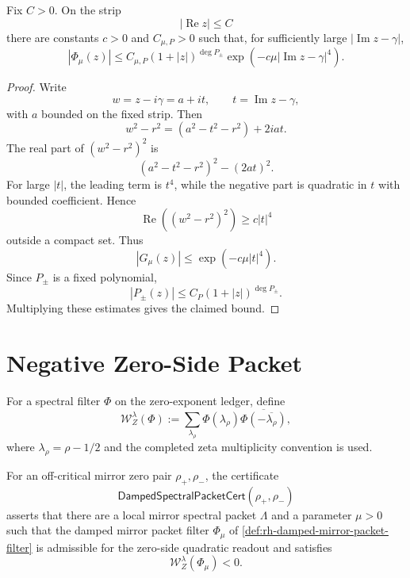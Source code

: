 \begin{theorem}
\label{thm:rh-damped-packet-filter-vertical-decay}
Fix $C>0$.  On the strip
$$
|\operatorname{Re} z|\le C
$$
there are constants $c>0$ and $C_{\mu,P}>0$ such that, for sufficiently
large $|\operatorname{Im}z-\gamma|$,
$$
|\Phi_\mu(z)|
\le
C_{\mu,P}(1+|z|)^{\deg P_\pm}
\exp\left(-c\mu|\operatorname{Im}z-\gamma|^4\right).
$$
\end{theorem}

\begin{proof}
Write
$$
w=z-i\gamma=a+it,
\qquad
t=\operatorname{Im}z-\gamma,
$$
with $a$ bounded on the fixed strip.  Then
$$
w^2-r^2=(a^2-t^2-r^2)+2iat.
$$
The real part of $(w^2-r^2)^2$ is
$$
(a^2-t^2-r^2)^2-(2at)^2.
$$
For large $|t|$, the leading term is $t^4$, while the negative part is
quadratic in $t$ with bounded coefficient.  Hence
$$
\operatorname{Re}\left((w^2-r^2)^2\right)\ge c|t|^4
$$
outside a compact set.  Thus
$$
|G_\mu(z)|
\le
\exp(-c\mu|t|^4).
$$
Since $P_\pm$ is a fixed polynomial,
$$
|P_\pm(z)|
\le
C_P(1+|z|)^{\deg P_\pm}.
$$
Multiplying these estimates gives the claimed bound.
\end{proof}

\section{Negative Zero-Side Packet}
\label{sec:rh-damped-spectral-negative-packet}

\begin{definition}
\label{def:rh-exponent-mirror-quadratic-readout}
For a spectral filter $\Phi$ on the zero-exponent ledger, define
$$
\mathcal W_Z^\lambda(\Phi)
:=
\sum_{\lambda_\rho}
\Phi(\lambda_\rho)
\overline{\Phi(-\overline{\lambda_\rho})},
$$
where $\lambda_\rho=\rho-1/2$ and the completed zeta multiplicity
convention is used.
\end{definition}

\begin{definition}[DampedSpectralPacketCert]
\label{def:rh-damped-spectral-packet-cert}
For an off-critical mirror zero pair $\rho_+,\rho_-$, the certificate
$$
\mathsf{DampedSpectralPacketCert}(\rho_+,\rho_-)
$$
asserts that there are a local mirror spectral packet $\Lambda$ and a
parameter $\mu>0$ such that the damped mirror packet filter
$\Phi_\mu$ of \autoref{def:rh-damped-mirror-packet-filter} is
admissible for the zero-side quadratic readout and satisfies
$$
\mathcal W_Z^\lambda(\Phi_\mu)<0.
$$
\end{definition}

